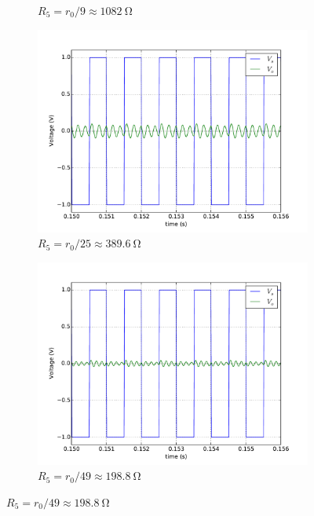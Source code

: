 \documentclass[12pt, a4paper]{article}
\begin{document}
\begin{enumerate}[itemsep=20pt, topsep=10pt]
\begin{figure}[H]
\begin{subfigure}[b]{0.45\textwidth}
        \caption{$R_5 = r_0 / 9 \approx \SI{1082}{\ohm} $}
      \end{subfigure}
      \begin{subfigure}[b]{0.45\textwidth}
        \includegraphics[width=1\textwidth]{circuit/p25.pdf}
        \caption{$R_5 = r_0 / 25 \approx \SI{389.6}{\ohm} $}
      \end{subfigure}
      \begin{subfigure}[b]{0.45\textwidth}
        \includegraphics[width=1\textwidth]{circuit/p49.pdf}
        \caption{$R_5 = r_0 / 49 \approx \SI{198.8}{\ohm} $}
      \end{subfigure}
    \end{figure}

\end{enumerate}
\end{document}
